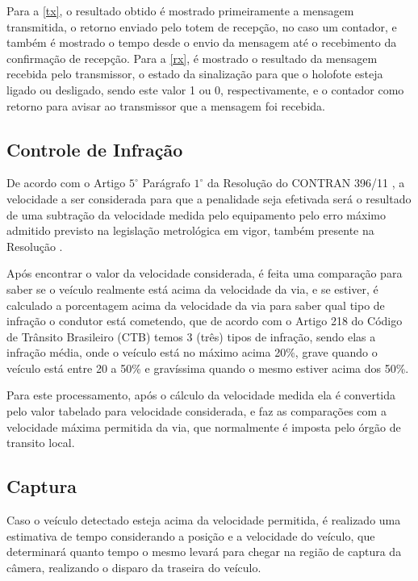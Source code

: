 Para a \ref{tx}, o resultado obtido é mostrado primeiramente a mensagem transmitida, o retorno enviado pelo totem de recepção, no caso um contador, e também é mostrado o tempo desde o envio da mensagem até o recebimento da confirmação de recepção. Para a \ref{rx}, é mostrado o resultado da mensagem recebida pelo transmissor, o estado da sinalização para que o holofote esteja ligado ou desligado, sendo este valor 1 ou 0, respectivamente, e o contador como retorno para avisar ao transmissor que a mensagem foi recebida.
 
  \subsection{Controle de Infração}
  
De acordo com o Artigo $5^{\circ}$ Parágrafo $1^{\circ}$ da Resolução do CONTRAN 396/11 \cite{CONTRAN}, a velocidade a ser considerada para que a penalidade seja efetivada será o resultado de uma subtração da velocidade medida pelo equipamento pelo erro máximo admitido previsto na legislação metrológica em vigor, também presente na Resolução \cite{CONTRAN}.
   
 Após encontrar o valor da velocidade considerada, é feita uma comparação para saber se o veículo realmente está acima da velocidade da via, e se estiver, é calculado a porcentagem acima da velocidade da via para saber qual tipo de infração o condutor está cometendo, que de acordo com o Artigo 218 do Código de Trânsito Brasileiro (CTB) \cite{ctb} temos 3 (três) tipos de infração, sendo elas a infração média, onde o veículo está no máximo acima 20\%, grave quando o veículo está entre 20 a 50\% e gravíssima quando o mesmo estiver acima dos 50\%.   
    
Para este processamento, após o cálculo da velocidade medida ela é convertida pelo valor tabelado para velocidade considerada, e faz as comparações com a velocidade máxima permitida da via, que normalmente é imposta pelo órgão de transito local.    

\subsection{Captura}
    
Caso o veículo detectado esteja acima da velocidade permitida, é realizado uma estimativa de tempo considerando a posição e a velocidade do veículo, que determinará quanto tempo o mesmo levará para chegar na região de captura da câmera, realizando o disparo da traseira do veículo.
    
